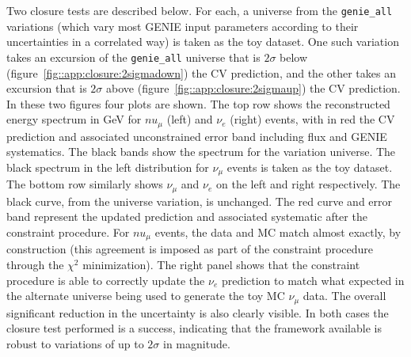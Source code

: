 \documentclass[a4paper]{article}
\begin{document}
\par Two closure tests are described below. For each, a universe from the \texttt{genie\_all} variations (which vary most GENIE input parameters according to their uncertainties in a correlated way) is taken as the toy dataset. One such variation takes an excursion of the \texttt{genie\_all} universe that is $2\sigma$ below (figure~\ref{fig::app:closure:2sigmadown}) the CV prediction, and the other takes an excursion that is $2\sigma$ above (figure~\ref{fig::app:closure:2sigmaup}) the CV prediction. In these two figures four plots are shown. The top row shows the reconstructed energy spectrum in GeV for $nu_{\mu}$ (left) and $\nu_e$ (right) events, with in red the CV prediction and associated unconstrained error band including flux and GENIE systematics. The black bands show the spectrum for the variation universe. The black spectrum in the left distribution for $\nu_{\mu}$ events is taken as the toy dataset. The bottom row similarly shows $\nu_{\mu}$ and $\nu_e$ on the left and right respectively. The black curve, from the universe variation, is unchanged. The red curve and error band represent the updated prediction and associated systematic after the constraint procedure. For $nu_{\mu}$ events, the data and MC match almost exactly, by construction (this agreement is imposed as part of the constraint procedure through the $\chi^2$ minimization). The right panel shows that the constraint procedure is able to correctly update the $\nu_e$ prediction to match what expected in the alternate universe being used to generate the toy MC $\nu_{\mu}$ data. The overall significant reduction in the uncertainty is also clearly visible. In both cases the closure test performed is a success, indicating that the framework available is robust to variations of up to $2\sigma$ in magnitude.
\end{document}
